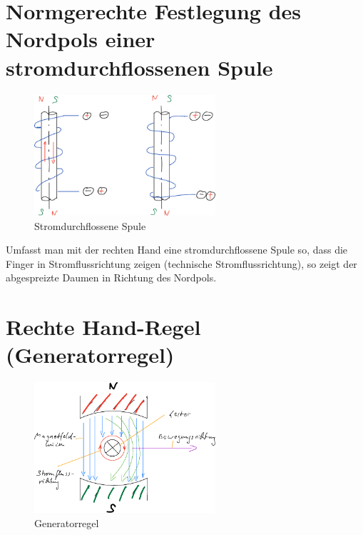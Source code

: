 \section{Normgerechte Festlegung des Nordpols einer stromdurchflossenen
Spule}\label{normgerechte-festlegung-des-nordpols-einer-stromdurchflossenen-spule}

\begin{figure}[!ht]%
\centering
\includegraphics[width=0.6\textwidth]{images/Skizze/03_StromdurchflosseneSpule_Skizze.pdf}
\caption{Stromdurchflossene Spule}
\end{figure}

Umfasst man mit der rechten Hand eine stromdurchflossene Spule so, dass
die Finger in Stromflussrichtung zeigen (technische Stromflussrichtung),
so zeigt der abgespreizte Daumen in Richtung des Nordpols.

\newpage

\section{Rechte Hand-Regel
(Generatorregel)}\label{rechte-hand-regel-generatorregel}

\begin{figure}[!ht]%
\centering
\includegraphics[width=0.6\textwidth]{images/Skizze/01_Generatorregel_Skizze.pdf}
\caption{Generatorregel}
\end{figure}


